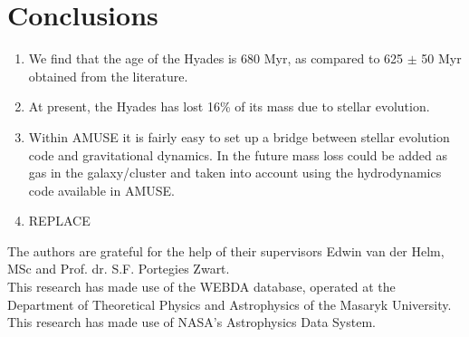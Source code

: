 \documentclass{aa}
\begin{document}
\section{Conclusions}\label{sec:conclusions}
\begin{enumerate}
    \item We find that the age of the Hyades is 680 Myr, as compared to 625 $\pm$ 50 Myr obtained from the literature.
    \item At present, the Hyades has lost 16\% of its mass due to stellar evolution.
    \item Within AMUSE it is fairly easy to set up a bridge between stellar evolution code and gravitational dynamics. In the future mass loss could be added as gas in the galaxy/cluster and taken into account using the hydrodynamics code available in AMUSE.
    \item REPLACE
   \end{enumerate}


\begin{acknowledgements}
The authors are grateful for the help of their supervisors Edwin van der Helm, MSc and Prof. dr. S.F. Portegies Zwart. \\

This research has made use of the WEBDA database, operated at the Department of Theoretical Physics and Astrophysics of the Masaryk University. \\

This research has made use of NASA's Astrophysics Data System.
\end{acknowledgements}





\end{document}
